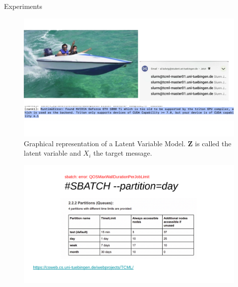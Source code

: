 \documentclass[
	11pt, %
	aspectratio=169, %
]{beamer}
\begin{document}
\begin{frame}{Experiments}
		\begin{figure}[ht]
        \centering
		\includegraphics[width=14cm]{figures/NanoGPTFUN.png}
        \caption{Graphical representation of a Latent Variable Model. $\mathbf{Z}$ is called the latent variable and  $X_i$ the target message.}
        \label{fig:LVM}
    \end{figure}
\end{frame}

\begin{frame}
		\begin{figure}[ht]
        \centering
		\includegraphics[width=14cm]{figures/cluster_advice.png}
    \end{figure}
\end{frame}
\end{document}
